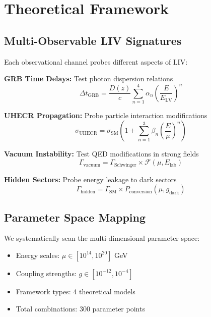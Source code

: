 \documentclass[12pt]{article}
\begin{document}
\section{Theoretical Framework}

\subsection{Multi-Observable LIV Signatures}

Each observational channel probes different aspects of LIV:

\textbf{GRB Time Delays:} Test photon dispersion relations
\begin{equation}
\Delta t_{\text{GRB}} = \frac{D(z)}{c} \sum_{n=1}^4 \alpha_n \left(\frac{E}{E_{\text{LV}}}\right)^n
\end{equation}

\textbf{UHECR Propagation:} Probe particle interaction modifications  
\begin{equation}
\sigma_{\text{UHECR}} = \sigma_{\text{SM}} \left(1 + \sum_{n=1}^3 \beta_n \left(\frac{E}{\mu}\right)^n\right)
\end{equation}

\textbf{Vacuum Instability:} Test QED modifications in strong fields
\begin{equation}
\Gamma_{\text{vacuum}} = \Gamma_{\text{Schwinger}} \times \mathcal{F}(\mu, E_{\text{lab}})
\end{equation}

\textbf{Hidden Sectors:} Probe energy leakage to dark sectors
\begin{equation}
\Gamma_{\text{hidden}} = \Gamma_{\text{SM}} \times P_{\text{conversion}}(\mu, g_{\text{dark}})
\end{equation}

\subsection{Parameter Space Mapping}

We systematically scan the multi-dimensional parameter space:
\begin{itemize}
\item Energy scales: $\mu \in [10^{14}, 10^{20}]$ GeV
\item Coupling strengths: $g \in [10^{-12}, 10^{-4}]$
\item Framework types: 4 theoretical models
\item Total combinations: 300 parameter points
\end{itemize}
\end{document}
